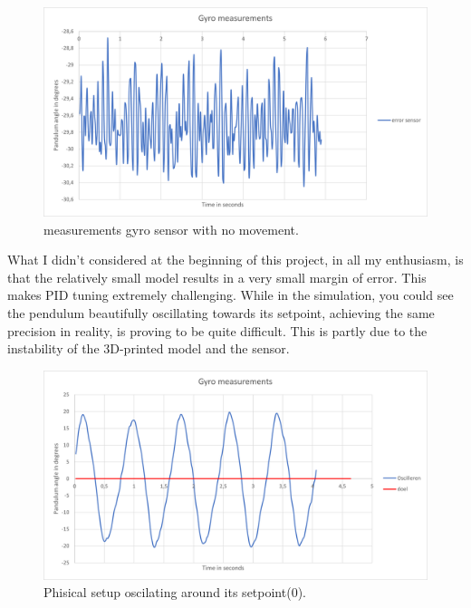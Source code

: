 \documentclass{article}
\begin{document}
\begin{multicols}{2}
\begin{figure}[H]
\centering
\includegraphics[scale=0.37]{Gyro meting}
\caption{measurements gyro sensor with no movement.}
\label{fig:measurements gyro sensor}
\end{figure}

What I didn't considered at the beginning of this project, in all my enthusiasm, is that the relatively small model results in a very small margin of error. This makes PID tuning extremely challenging. While in the simulation, you could see the pendulum beautifully oscillating towards its setpoint, achieving the same precision in reality, is proving to be quite difficult. This is partly due to the instability of the 3D-printed model and the sensor.

\begin{figure}[H]
\centering
\includegraphics[scale=0.37]{Model Oscilating}
\caption{Phisical setup oscilating around its setpoint(0).}
\label{fig:Model oscilating to its setpoint(0)}
\end{figure}


\end{multicols}
\end{document}
